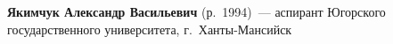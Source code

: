 \begin{multicols}{2}
\noindent
\textbf{Якимчук Александр Васильевич} (р.\ 1994)~--- 
аспирант Югорского государственного университета, г.~Хан\-ты-Ман\-сийск








\def\leftkol{ОБ АВТОРАХ}

\def\rightkol{ОБ АВТОРАХ}


 \label{end\stat}






\end{multicols}

\def\leftkol{ОБ АВТОРАХ}
\def\rightkol{ОБ АВТОРАХ}

\newpage